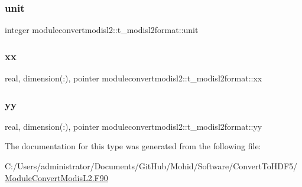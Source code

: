 \subsubsection{\texorpdfstring{unit}{unit}}
{\footnotesize\ttfamily integer moduleconvertmodisl2\+::t\+\_\+modisl2format\+::unit\hspace{0.3cm}{\ttfamily [private]}}

\mbox{\label{structmoduleconvertmodisl2_1_1t__modisl2format_a342202d7b4d06b4f3a586c2f9b2c0e16}} 
\subsubsection{\texorpdfstring{xx}{xx}}
{\footnotesize\ttfamily real, dimension(\+:), pointer moduleconvertmodisl2\+::t\+\_\+modisl2format\+::xx\hspace{0.3cm}{\ttfamily [private]}}

\mbox{\label{structmoduleconvertmodisl2_1_1t__modisl2format_a90aa43674aa38a9b463a6befad57143c}} 
\subsubsection{\texorpdfstring{yy}{yy}}
{\footnotesize\ttfamily real, dimension(\+:), pointer moduleconvertmodisl2\+::t\+\_\+modisl2format\+::yy\hspace{0.3cm}{\ttfamily [private]}}



The documentation for this type was generated from the following file\+:\begin{DoxyCompactItemize}
\item 
C\+:/\+Users/administrator/\+Documents/\+Git\+Hub/\+Mohid/\+Software/\+Convert\+To\+H\+D\+F5/\mbox{\hyperlink{_module_convert_modis_l2_8_f90}{Module\+Convert\+Modis\+L2.\+F90}}\end{DoxyCompactItemize}
